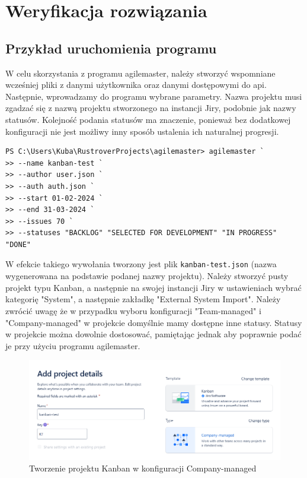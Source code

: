 \section{Weryfikacja rozwiązania}
\subsection{Przykład uruchomienia programu}
W celu skorzystania z programu agilemaster, należy stworzyć wspomniane wcześniej pliki z danymi użytkownika oraz danymi dostępowymi do api.
Następnie, wprowadzamy do programu wybrane parametry. Nazwa projektu musi zgadzać się z nazwą projektu stworzonego na instancji Jiry, podobnie jak nazwy statusów.
Kolejność podania statusów ma znaczenie, ponieważ bez dodatkowej konfiguracji nie jest możliwy inny sposób ustalenia ich naturalnej progresji.
\begin{lstlisting}[caption=Przykładowe użycie programu agilemaster]
PS C:\Users\Kuba\RustroverProjects\agilemaster> agilemaster `
>> --name kanban-test `
>> --author user.json `
>> --auth auth.json `
>> --start 01-02-2024 `
>> --end 31-03-2024 `
>> --issues 70 `
>> --statuses "BACKLOG" "SELECTED FOR DEVELOPMENT" "IN PROGRESS" "DONE"
\end{lstlisting}

W efekcie takiego wywołania tworzony jest plik \texttt{kanban-test.json} (nazwa wygenerowana na podstawie podanej nazwy projektu).
Należy stworzyć pusty projekt typu Kanban, a następnie na swojej instancji Jiry w ustawieniach wybrać kategorię "System", a następnie zakładkę "External System Import".
Należy zwrócić uwagę że w przypadku wyboru konfiguracji "Team-managed" i "Company-managed" w projekcie domyślnie mamy dostępne inne statusy.
Statusy w projekcie można dowolnie dostosować, pamiętając jednak aby poprawnie podać je przy użyciu programu agilemaster.
\begin{figure}[H]
    \centering
    \includegraphics[width=15cm,keepaspectratio]{rysunki/jira-create-project.png}
    \caption{Tworzenie projektu Kanban w konfiguracji Company-managed}
\end{figure}

